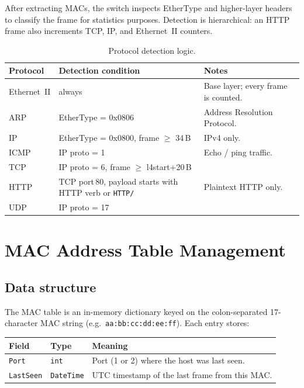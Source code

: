 \documentclass[12pt,a4paper]{article}
\begin{document}
After extracting MACs, the switch inspects EtherType and higher-layer headers
to classify the frame for statistics purposes.  Detection is hierarchical: an
HTTP frame also increments TCP, IP, and Ethernet~II counters.

\begin{table}[H]
\centering
\caption{Protocol detection logic.}
\label{tab:protos}
\begin{tabularx}{\linewidth}{llX}
\toprule
\textbf{Protocol} & \textbf{Detection condition} & \textbf{Notes} \\
\midrule
Ethernet~II & always & Base layer; every frame is counted. \\
ARP         & EtherType = 0x0806 & Address Resolution Protocol. \\
IP          & EtherType = 0x0800, frame $\geq$ 34\,B & IPv4 only. \\
ICMP        & IP proto = 1 & Echo / ping traffic. \\
TCP         & IP proto = 6, frame $\geq$ l4start+20\,B & \\
HTTP        & TCP port\,80, payload starts with HTTP verb or \texttt{HTTP/} &
              Plaintext HTTP only. \\
UDP         & IP proto = 17 & \\
\bottomrule
\end{tabularx}
\end{table}

\section{MAC Address Table Management}
\label{sec:mac}

\subsection{Data structure}

The MAC table is an in-memory dictionary keyed on the colon-separated
17-character MAC string (e.g.\ \texttt{aa:bb:cc:dd:ee:ff}).
Each entry stores:

\begin{center}
\begin{tabular}{lll}
\toprule
\textbf{Field}    & \textbf{Type}     & \textbf{Meaning} \\
\midrule
\texttt{Port}     & \texttt{int}      & Port (1 or 2) where the host was last seen. \\
\texttt{LastSeen} & \texttt{DateTime} & UTC timestamp of the last frame from this MAC. \\
\bottomrule
\end{tabular}
\end{center}
\end{document}
